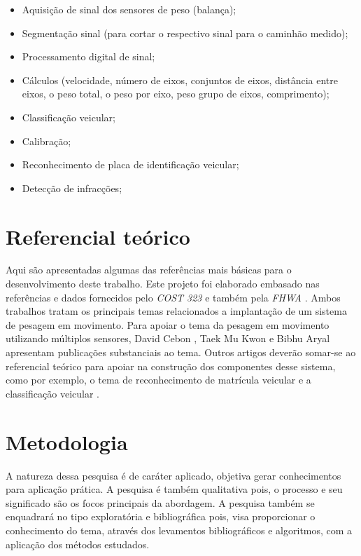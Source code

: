 \documentclass{ufscThesis}
\begin{document}
\begin{itemize}
\item Aquisição de sinal dos sensores de peso (balança);
\item Segmentação sinal (para cortar o respectivo sinal para o caminhão medido);
\item Processamento digital de sinal;
\item Cálculos (velocidade, número de eixos, conjuntos de eixos, distância entre eixos, o peso total, o peso por eixo, peso grupo de eixos, comprimento);
\item Classificação veicular;
\item Calibração;
\item Reconhecimento de placa de identificação veicular;
\item Detecção de infracções;
\end{itemize}

\section{Referencial teórico}\label{introducao-referencial}
Aqui são apresentadas algumas das referências mais básicas para o desenvolvimento deste trabalho. Este projeto foi elaborado embasado nas referências e dados fornecidos pelo \textit{COST 323} \cite{tech:cost-323} e também pela \textit{FHWA} \cite{tech:fhwa-wim-data-analysts-manual}. Ambos trabalhos tratam os principais temas relacionados a implantação de um sistema de pesagem em movimento. Para apoiar o tema da pesagem em movimento utilizando múltiplos sensores, David Cebon \cite{study-of-road-damage}, Taek Mu Kwon e Bibhu Aryal \cite{tech:dev-pc-eight-channel-wim-system} apresentam publicações substanciais ao tema. Outros artigos deverão somar-se ao referencial teórico para apoiar na construção dos componentes desse sistema, como por exemplo, o tema de reconhecimento de matrícula veicular \cite{article:alpr-using-python-and-opencv} e a classificação veicular \cite{tech:optimization-vehicle-classification}.

\section{Metodologia}\label{introducao-metodologia}
A natureza dessa pesquisa é de caráter aplicado, objetiva gerar conhecimentos para aplicação prática. A pesquisa é também qualitativa pois, o processo e seu significado são os focos principais da abordagem. A pesquisa também se enquadrará no tipo exploratória e bibliográfica pois, visa proporcionar o conhecimento do tema, através dos levamentos bibliográficos e algoritmos, com a aplicação dos métodos estudados.
\end{document}

